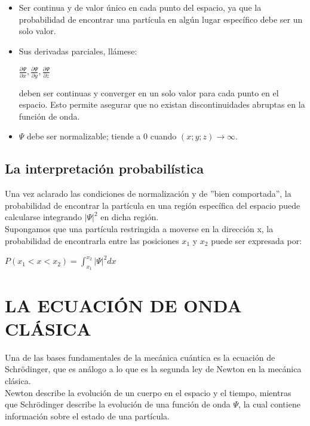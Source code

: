\documentclass[a4paper]{article}
\begin{document}
        \begin{itemize} 
            \item Ser continua y de valor único en cada punto del espacio, ya que la probabilidad de encontrar una partícula en algún lugar específico debe ser un solo valor.
            \saltoPag
            \item Sus derivadas parciales, llámese:
                \begin{center}
                    $\frac {\partial \Psi}{\partial x}, \frac{\partial \Psi}{\partial y}, \frac{\partial \Psi}{\partial z}$
                \end{center}
            deben ser continuas y converger en un solo valor para cada punto en el espacio. Esto permite asegurar que no existan discontinuidades abruptas en la función de onda.
        \item $\Psi$ debe ser normalizable; tiende a 0 cuando $(x;y;z) \rightarrow \infty$.
        \end{itemize}

    \subsection{La interpretación probabilística}
        \indent Una vez aclarado las condiciones de normalización y de ''bien comportada'', la probabilidad de encontrar la partícula en una región específica del espacio puede calcularse integrando $|\Psi|^2$ en dicha región. \\
        \indent Supongamos que una partícula restringida a moverse en la dirección x, la probabilidad de encontrarla entre las posiciones $x_1$ y $x_2$ puede ser expresada por:

        \begin{center}
            $P(x_1 < x < x_2) = \int_{x_1}^{x_2} |\Psi|^2 dx $
        \end{center}

\section{LA ECUACIÓN DE ONDA CLÁSICA}
    \indent Una de las bases fundamentales de la mecánica cuántica es la ecuación de Schrödinger, que es análogo a lo que es la segunda ley de Newton en la mecánica clásica. \\
    \indent Newton describe la evolución de un cuerpo en el espacio y el tiempo, mientras que Schrödinger describe la evolución de una función de onda $\Psi$, la cual contiene información sobre el estado de una partícula.
\end{document}
